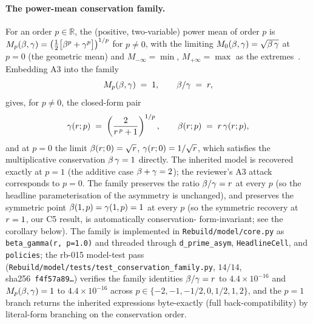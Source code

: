 \paragraph{The power-mean conservation family.}
For an order $p \in \mathbb{R}$, the (positive, two-variable) power
mean of order $p$ is
$M_p(\beta, \gamma) = \bigl(\frac{1}{2}\bigl[\beta^p +
\gamma^p\bigr]\bigr)^{1/p}$ for $p \ne 0$, with the limiting
$M_0(\beta, \gamma) = \sqrt{\beta\,\gamma}$ at $p = 0$ (the
geometric mean) and $M_{-\infty} = \min$, $M_{+\infty} = \max$ as the
extremes~\cite{HLP1934}. Embedding A3 into the family
%
\begin{equation}
  M_p(\beta, \gamma) \;=\; 1,
  \qquad
  \beta / \gamma \;=\; r,
  \label{eq:conservation-family}
\end{equation}
%
gives, for $p \ne 0$, the closed-form pair
%
\begin{equation}
  \gamma(r; p) \;=\;
  \left( \frac{2}{r^{\,p} + 1} \right)^{1/p},
  \qquad
  \beta(r; p) \;=\;
  r\,\gamma(r; p),
  \label{eq:beta-gamma-of-p}
\end{equation}
%
and at $p = 0$ the limit
$\beta(r; 0) = \sqrt{r}$,
$\gamma(r; 0) = 1/\sqrt{r}$, which satisfies the
multiplicative conservation $\beta\,\gamma = 1$ directly. The
inherited model is recovered exactly at $p = 1$ (the additive case
$\beta + \gamma = 2$); the reviewer's A3 attack corresponds to
$p = 0$. The family preserves the ratio $\beta/\gamma = r$ at
every $p$ (so the headline parameterisation of the asymmetry is
unchanged), and preserves the symmetric point
$\beta(1, p) = \gamma(1, p) = 1$ at every $p$ (so the symmetric
recovery at $r = 1$, our C5 result, is automatically conservation-
form-invariant; see the corollary below). The family is implemented
in \texttt{Rebuild/model/core.py} as
\texttt{beta\_gamma(r, p=1.0)} and threaded through
\texttt{d\_prime\_asym}, \texttt{HeadlineCell}, and \texttt{policies};
the rb-015 model-test pass (\texttt{Rebuild/model/tests/}\allowbreak\texttt{test\_conservation\_family.py},
$14/14$, sha256~\texttt{f4f57a89\ldots}) verifies the family
identities $\beta/\gamma = r$ to $4.4\!\times\!10^{-16}$ and
$M_p(\beta, \gamma) = 1$ to $4.4\!\times\!10^{-16}$ across $p \in
\{-2, -1, -1/2, 0, 1/2, 1, 2\}$, and the $p = 1$ branch returns the
inherited expressions byte-exactly (full back-compatibility) by
literal-form branching on the conservation order.

